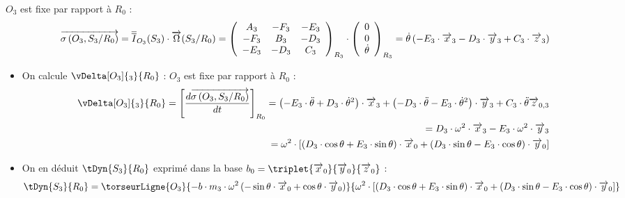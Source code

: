 \documentclass[10pt,fleqn]{article} %
\begin{document}
\begin{itemize}
$O_3$ est fixe par rapport à $R_0$ : 
\begin{align*}
\overrightarrow{\sigma \left( {O_3}, {S_3} /{R_0}\right)}=\overline{\overline{I}}_{O_3}(S_3)\cdot \overrightarrow{\Omega}(S_3/R_0)
=\left(\begin{array}{ccc}
A_3 & -F_3 & -E_3 \\ 
-F_3 & B_3 & -D_3 \\ 
-E_3 & -D_3 & C_3
\end{array} \right)_{R_3}\cdot
\left(\begin{array}{c}
0 \\ 
0 \\ 
\dot{\theta}
\end{array} \right)_{R_3}
=\dot{\theta}\left(-E_3\cdot \overrightarrow{x}_3-D_3\cdot \overrightarrow{y}_3+C_3\cdot \overrightarrow{z}_3\right)
\end{align*}
\end{itemize}

\begin{itemize}
\item On calcule $\vDelta[O_3]{_3}{R_0}$ : 
$O_3$ est fixe par rapport à $R_0$ : 
\begin{align*}
\vDelta[O_3]{_3}{R_0}=\left[\frac{d\vectmc{O_3}{S_3}{R_0}}{dt}\right]_{R_0}
=
\left(-E_3\cdot\ddot{\theta}+D_3\cdot \dot{\theta}^2\right)\cdot \overrightarrow{x}_3+\left(-D_3\cdot\ddot{\theta}-E_3\cdot \dot{\theta}^2\right)\cdot \overrightarrow{y}_3+C_3\cdot\ddot{\theta} \overrightarrow{z}_{0,3}\\
=D_3\cdot \omega^2\cdot \overrightarrow{x}_3-E_3\cdot \omega^2\cdot \overrightarrow{y}_3\\
=\omega^2\cdot \left[\left(D_3\cdot\cos\theta+E_3\cdot\sin\theta\right)\cdot \overrightarrow{x}_0+\left(D_3\cdot\sin\theta-E_3\cdot\cos\theta\right)\cdot \overrightarrow{y}_0\right]
\end{align*}

\item On en déduit $\tDyn{S_3}{R_0}$ exprimé dans la base $b_0=\triplet{\overrightarrow{x}_0}{\overrightarrow{y}_0}{\overrightarrow{z}_0}$ : 
\begin{align*}
\tDyn{S_3}{R_0}=\torseurLigne{O_3}{-b\cdot m_3\cdot \omega^2\left(-\sin\theta\cdot \overrightarrow{x}_0+\cos\theta\cdot \overrightarrow{y}_0\right)}{\omega^2\cdot \left[\left(D_3\cdot\cos\theta+E_3\cdot\sin\theta\right)\cdot \overrightarrow{x}_0+\left(D_3\cdot\sin\theta-E_3\cdot\cos\theta\right)\cdot \overrightarrow{y}_0\right]}
\end{align*}
\end{itemize}
\end{document}
